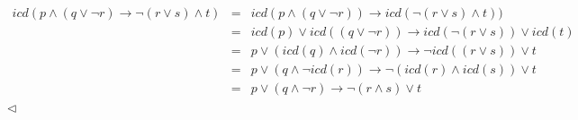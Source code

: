 \documentclass{article}
\begin{document}
\begin{enumerate}
\begin{itemize}
  \end{itemize}
  \begin{eqnarray*}
    icd(p \land (q \lor \neg r) \rightarrow \neg (r \lor s) \land t) &=&
    icd(p \land (q \lor \neg r)) \rightarrow icd(\neg (r \lor s) \land t))\\
    &=& icd(p) \lor icd((q \lor \neg r)) \rightarrow icd(\neg (r \lor s)) \lor icd(t)\\
    &=& p \lor (icd(q) \land icd(\neg r)) \rightarrow \neg icd((r \lor s)) \lor t\\
    &=& p \lor (q \land \neg icd(r)) \rightarrow \neg (icd(r) \land icd(s)) \lor t\\
    &=& p \lor (q \land \neg r) \rightarrow \neg (r \land s) \lor t
  \end{eqnarray*}
  \hfill $\lhd$
\end{enumerate}
\end{document}
